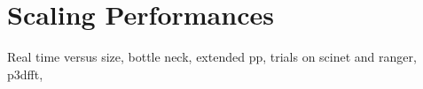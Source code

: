 \section{Scaling Performances}

Real time versus size, bottle neck, extended pp, trials on scinet and ranger, 
p3dfft,
